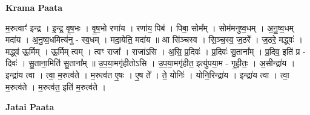 \documentclass[17pt]{extarticle}
\begin{document}
\textbf{Krama Paata} \newline

म॒रुत्वाꣳ॑ इन्द्र । इ॒न्द्र॒ वृ॒ष॒भः । वृ॒ष॒भो रणा॑य । रणा॑य॒ पिब॑ । पिबा॒ सोम᳚म् । सोम॑मनुष्व॒धम् । अ॒नु॒ष्व॒धम् मदा॑य । अ॒नु॒ष्व॒धमित्य॑नु - स्व॒धम् । मदा॒येति॒ मदा॑य ॥ आ सि॑ञ्चस्व । सि॒ञ्च॒स्व॒ ज॒ठरे᳚ । ज॒ठरे॒ मद्ध्वः॑ । मद्ध्व॑ ऊ॒र्मिम् । ऊ॒र्मिम् त्वम् । त्वꣳ राजा᳚ । राजा॑ऽसि । अ॒सि॒ प्र॒दिवः॑ । प्र॒दिवः॑ सु॒ताना᳚म् । प्र॒दिव॒ इति॑ प्र - दिवः॑ । सु॒ताना॒मिति॑ सु॒ताना᳚म् ॥ उ॒प॒या॒मगृ॑हीतोऽसि । उ॒प॒या॒मगृ॑हीत॒ इत्यु॑पया॒म - गृ॒ही॒तः॒ । अ॒सीन्द्रा॑य । इन्द्रा॑य त्वा । त्वा॒ म॒रुत्व॑ते । म॒रुत्व॑त ए॒षः । ए॒ष ते᳚ । ते॒ योनिः॑ । योनि॒रिन्द्रा॑य । इन्द्रा॑य त्वा । त्वा॒ म॒रुत्व॑ते । म॒रुत्व॑त॒ इति॑ म॒रुत्व॑ते । \newline

\textbf{Jatai Paata} \newline
\end{document}
